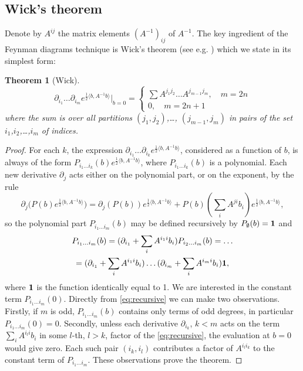 \documentclass[10pt]{amsart}
\newtheorem{thm}{Theorem}[section]
\theoremstyle{definition}
\theoremstyle{remark}
\newcommand{\dd}{\partial}
\def\<{\langle}
\def\>{\rangle}
\begin{document}
\subsection{Wick's theorem}
Denote by $A^{ij}$ the matrix elements $(A^{-1})_{ij}$ of
$A^{-1}$. The key ingredient of the Feynman diagrams technique is
Wick's theorem (see e.g. \cite{Sh}) which we state in its simplest form:
\begin{thm}[Wick]
\begin{equation}\label{wick}
\dd_{i_1}\dots\dd_{i_m} e^{\frac12\<b,A^{-1}b\>}
\big|_{b=0}=\begin{cases}
\sum A^{j_1 j_2}\dots A^{j_{m-1} j_m},\quad m=2n\\
0,\quad m=2n+1\end{cases}
\end{equation}
where the sum is over all partitions $(j_1,j_2)$,\dots,
$(j_{m-1},j_m)$ in pairs of the set $i_1$,$i_2$,\dots,$i_m$ of
indices.
\end{thm}
\begin{proof}
For each $k$, the expression $\dd_{i_1}\dots\dd_{i_k} e^{\frac12\<b,A^{-1}b\>}$,
considered as a function of $b$, is always of the form
$P_{i_1\dots i_k}(b)e^{\frac12\<b,A^{-1}b\>}$, where
$P_{i_1\dots i_k}(b)$ is a polynomial.
Each new derivative $\dd_j$ acts either on the polynomial part,
or on the exponent, by the rule
$$
   \dd_j\big(P(b)e^{\frac12\<b,A^{-1}b\>}\big)=
    \dd_j(P(b))e^{\frac12\<b,A^{-1}b\>}+
    P(b)(\sum_i A^{ji}b_i)e^{\frac12\<b,A^{-1}b\>},
$$
so the polynomial part $P_{i_1\dots i_m}(b)$ may be defined
recursively by $P_{\emptyset}(b)={\bf 1}$ and
\begin{multline}
\label{eq:recursive}
P_{i_1\dots i_m}(b)=
(\dd_{i_1}+\sum_i A^{i_1 i}b_i)P_{i_2\dots i_m}(b)=\dots\\
=(\dd_{i_1}+\sum_i A^{i_1 i}b_i) \dots (\dd_{i_m}+\sum_i
A^{i_m i}b_i) {\bf 1},
\end{multline}
where ${\bf 1}$ is the function identically equal to 1.
We are interested in the constant term $P_{i_1\dots i_m}(0)$.
Directly from \eqref{eq:recursive} we can make two observations.
Firstly, if $m$ is odd, $P_{i_1\dots i_m}(b)$ contains only
terms of odd degrees, in particular $P_{i_1\dots i_m}(0)=0$.
Secondly, unless each derivative $\dd_{i_k}$, $k<m$ acts on the
term $\sum_iA^{i_l i}b_i$ in some $l$-th, $l>k$, factor of the
\eqref{eq:recursive}, the evaluation at $b=0$ would give zero.
Each such pair $(i_k,i_l)$ contributes a factor of $A^{i_li_k}$
to the constant  term of $P_{i_1\dots i_m}$.
These observations prove the theorem.
\end{proof}
\end{document}
